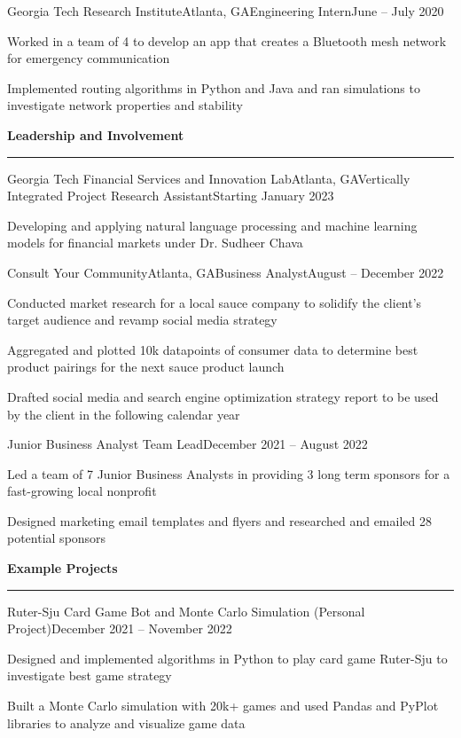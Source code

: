 \documentclass{article}
\newcommand{\horizontal}{\vspace{3pt}\hrule}
\newcommand{\sectitle}[1]{\vspace{3pt} \textbf{\large #1} \horizontal}
\begin{document}
\begin{flushleft}
    \begin{experience}{Georgia Tech Research Institute}{Atlanta, GA}{Engineering Intern}{June -- July 2020}
        \item Worked in a team of 4 to develop an app that creates a Bluetooth mesh network for emergency communication
        \item Implemented routing algorithms in Python and Java and ran simulations to investigate network properties and stability
    \end{experience}


\sectitle{Leadership and Involvement}

    \begin{experience}{Georgia Tech Financial Services and Innovation Lab}{Atlanta, GA}{Vertically Integrated Project Research Assistant}{Starting January 2023}
        \item Developing and applying natural language processing and machine learning models for financial markets under Dr. Sudheer Chava
    \end{experience}

    \begin{experience}{Consult Your Community}{Atlanta, GA}{Business Analyst}{August -- December 2022}
        \item Conducted market research for a local sauce company to solidify the client's target audience and revamp social media strategy
        \item Aggregated and plotted 10k datapoints of consumer data to determine best product pairings for the next sauce product launch
        \item Drafted social media and search engine optimization strategy report to be used by the client in the following calendar year

    \end{experience}
    \begin{subexperience}{Junior Business Analyst Team Lead}{December 2021 -- August 2022}
        \item Led a team of 7 Junior Business Analysts in providing 3 long term sponsors for a fast-growing local nonprofit
        \item Designed marketing email templates and flyers and researched and emailed 28 potential sponsors
    \end{subexperience}

\sectitle{Example Projects}

    \vspace{3pt}
    \begin{subexperience}{Ruter-Sju Card Game Bot and Monte Carlo Simulation (Personal Project)}{December 2021 -- November 2022}
        \item Designed and implemented algorithms in Python to play card game Ruter-Sju to investigate best game strategy
        \item Built a Monte Carlo simulation with 20k+ games and used Pandas and PyPlot libraries to analyze and visualize game data
    \end{subexperience}


\end{flushleft}
\end{document}
